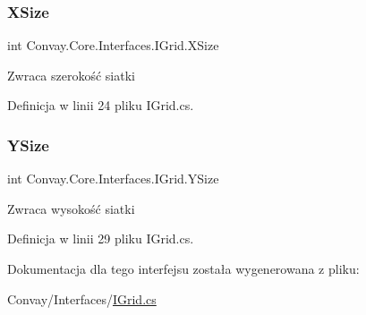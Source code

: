 \subsubsection{\texorpdfstring{X\+Size}{XSize}}
{\footnotesize\ttfamily int Convay.\+Core.\+Interfaces.\+I\+Grid.\+X\+Size\hspace{0.3cm}{\ttfamily [get]}}



Zwraca szerokość siatki 



Definicja w linii 24 pliku I\+Grid.\+cs.

\hypertarget{interface_convay_1_1_core_1_1_interfaces_1_1_i_grid_a049f4b262c16e04b2bd4e83c2c30deac}{}\label{interface_convay_1_1_core_1_1_interfaces_1_1_i_grid_a049f4b262c16e04b2bd4e83c2c30deac} 
\subsubsection{\texorpdfstring{Y\+Size}{YSize}}
{\footnotesize\ttfamily int Convay.\+Core.\+Interfaces.\+I\+Grid.\+Y\+Size\hspace{0.3cm}{\ttfamily [get]}}



Zwraca wysokość siatki 



Definicja w linii 29 pliku I\+Grid.\+cs.



Dokumentacja dla tego interfejsu została wygenerowana z pliku\+:\begin{DoxyCompactItemize}
\item 
Convay/\+Interfaces/\hyperlink{_i_grid_8cs}{I\+Grid.\+cs}\end{DoxyCompactItemize}

